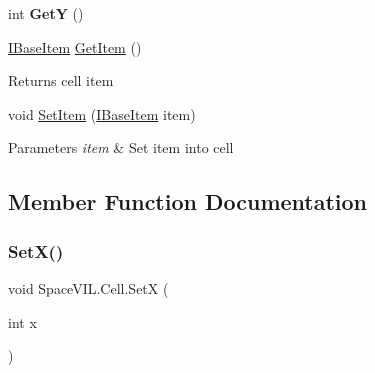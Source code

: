\begin{DoxyCompactItemize}
int {\bfseries GetY} ()
\item 
\mbox{\label{class_space_v_i_l_1_1_cell_aadd83fb3bde0ce98c3e78af3b7b33ba6}} 
\mbox{\hyperlink{interface_space_v_i_l_1_1_core_1_1_i_base_item}{I\+Base\+Item}} \mbox{\hyperlink{class_space_v_i_l_1_1_cell_aadd83fb3bde0ce98c3e78af3b7b33ba6}{Get\+Item}} ()
\begin{DoxyCompactList}\small\item\em \begin{DoxyReturn}{Returns}
cell item 
\end{DoxyReturn}
\end{DoxyCompactList}\item 
\mbox{\label{class_space_v_i_l_1_1_cell_a43598f1cee7871119f502dc95bc2b652}} 
void \mbox{\hyperlink{class_space_v_i_l_1_1_cell_a43598f1cee7871119f502dc95bc2b652}{Set\+Item}} (\mbox{\hyperlink{interface_space_v_i_l_1_1_core_1_1_i_base_item}{I\+Base\+Item}} item)
\begin{DoxyCompactList}\small\item\em 
\begin{DoxyParams}{Parameters}
{\em item} & Set item into cell \\
\hline
\end{DoxyParams}
\end{DoxyCompactList}\end{DoxyCompactItemize}


\subsection{Member Function Documentation}
\mbox{\label{class_space_v_i_l_1_1_cell_aa6cdc40507c12d0e0bb40e7daa59ab83}} 
\subsubsection{\texorpdfstring{Set\+X()}{SetX()}}
{\footnotesize\ttfamily void Space\+V\+I\+L.\+Cell.\+SetX (\begin{DoxyParamCaption}\item[{int}]{x }\end{DoxyParamCaption})}



